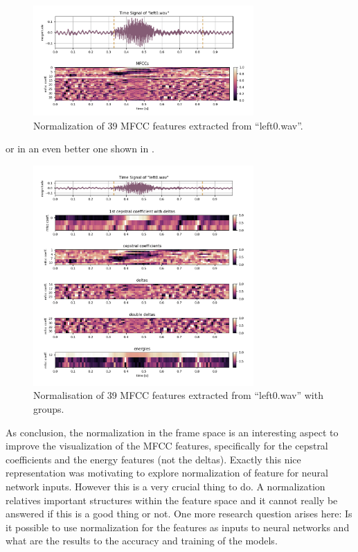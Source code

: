 \begin{figure}[!ht]
  \centering
    \includegraphics[width=0.75\textwidth]{./3_signal/figs/signal_mfcc_left0_no_order_norm1.png}
  \caption{Normalization of 39 MFCC features extracted from \enquote{left0.wav}.}
  \label{fig:left0_no_order_norm1}
\end{figure}
\FloatBarrier
\noindent
or in an even better one shown in .

\begin{figure}[!ht]
  \centering
    \includegraphics[width=0.75\textwidth]{./3_signal/figs/signal_mfcc_left0_order_norm1.png}
  \caption{Normalisation of 39 MFCC features extracted from \enquote{left0.wav} with groups.}
  \label{fig:left0_order_norm1}
\end{figure}
\FloatBarrier
\noindent
As conclusion, the normalization in the frame space is an interesting aspect to improve the visualization of the MFCC features, 
specifically for the cepstral coefficients and the energy features (not the deltas).
Exactly this nice representation was motivating to explore normalization of feature for neural network inputs.
However this is a very crucial thing to do. A normalization relatives important structures within the feature space and it cannot really be answered if this is a good thing or not.
One more research question arises here: Is it possible to use normalization for the features as inputs to neural networks and what are the results to the accuracy and training of the models.